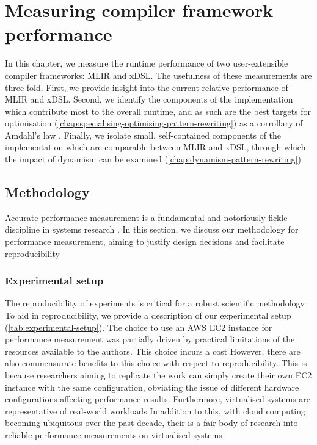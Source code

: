 \chapter{Measuring compiler framework performance}
\label{chap:measuring-compiler-performance}

In this chapter, we measure the runtime performance of two user-extensible compiler frameworks: MLIR and xDSL.
The usefulness of these measurements are three-fold. First, we provide insight into the current relative performance of MLIR and xDSL. %
Second, we identify the components of the implementation which contribute most to the overall runtime, and as such are the best targets for optimisation (\autoref{chap:specialising-optimising-pattern-rewriting}) as a corrollary of Amdahl's law \cite{amdahlValiditySingleProcessor1967}.
Finally, we isolate small, self-contained components of the implementation which are comparable between MLIR and xDSL, through which the impact of dynamism can be examined (\autoref{chap:dynamism-pattern-rewriting}).





\section{Methodology}
\label{sec:methodology}

Accurate performance measurement is a fundamental and notoriously fickle discipline in systems research \cite{}.
In this section, we discuss our methodology for performance measurement, aiming to justify design decisions and facilitate reproducibility

\subsection{Experimental setup}
\label{ssec:experimental-setup}

The reproducibility of experiments is critical for a robust scientific methodology.
To aid in reproducibility, we provide a description of our experimental setup (\autoref{tab:experimental-setup}).
The choice to use an AWS EC2 instance for performance measurement was partially driven by practical limitations of the resources available to the authors.
This choice incurs a cost
However, there are also commensurate benefits to this choice with respect to reproducibility. This is because researchers aiming to replicate the work can simply create their own EC2 instance with the same configuration, obviating the issue of different hardware configurations affecting performance results.
Furthermore, virtualised systems are representative of real-world workloads
In addition to this, with cloud computing becoming ubiquitous over the past decade, their is a fair body of research into reliable performance measurements on virtualised systems

